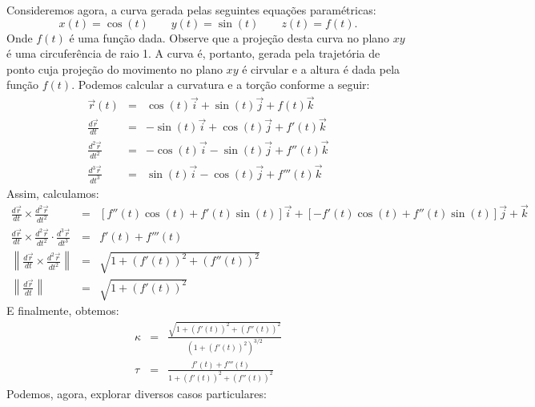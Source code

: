 \begin{ex} \label{exemplo_sincosf} Consideremos agora, a curva gerada pelas seguintes equações paramétricas:
$$x(t)=\cos(t)\qquad y(t)=\sin(t)\qquad z(t)=f(t).$$
 Onde $f(t)$ é uma função dada. Observe que a projeção desta curva no plano $xy$ é uma circuferência de raio 1. A curva é, portanto, gerada pela trajetória de ponto cuja projeção do movimento no plano $xy$ é cirvular e a altura é dada pela função $f(t)$. Podemos calcular a curvatura e a torção conforme a seguir:
 \begin{eqnarray*}
  \vec{r}(t)&=&\cos(t)\vec{i}+\sin(t)\vec{j}+f(t)\vec{k}\\
  \frac{d\vec{r}}{dt}&=&-\sin(t)\vec{i}+\cos(t)\vec{j}+f'(t)\vec{k}\\
  \frac{d^2\vec{r}}{dt^2}&=&-\cos(t)\vec{i}-\sin(t)\vec{j}+f''(t)\vec{k}\\
  \frac{d^3\vec{r}}{dt^3}&=&\sin(t)\vec{i}-\cos(t)\vec{j}+f'''(t)\vec{k}
 \end{eqnarray*}
Assim, calculamos:
 \begin{eqnarray*}
  \frac{d\vec{r}}{dt} \times \frac{d^2 \vec{r}}{dt^2} &=&\left[f''(t)\cos(t)+f'(t)\sin(t)\right]\vec{i}+\left[-f'(t)\cos(t)+f''(t)\sin(t)\right]\vec{j}+\vec{k}\\
\frac{d \vec{r}}{dt} \times \frac{d^2\vec{r}}{dt^2} \cdot \frac{d^3\vec{r}}{dt^3} &=&f'(t)+f'''(t)\\
 \left\|\frac{d\vec{r}}{dt} \times\frac{d^2\vec{r}}{dt^2}\right\|&=&\sqrt{1+\left(f'(t)\right)^2+\left(f''(t)\right)^2}\\
 \left\|\frac{d\vec{r}}{dt}\right\|&=&\sqrt{1+\left(f'(t)\right)^2}
 \end{eqnarray*}
E finalmente, obtemos:
 \begin{eqnarray*}
\kappa&=&\frac{\sqrt{1+\left(f'(t)\right)^2+\left(f''(t)\right)^2}}{\left({1+\left(f'(t)\right)^2}\right)^{3/2}}\\
\tau&=&\frac{f'(t)+f'''(t)}{1+\left(f'(t)\right)^2+\left(f''(t)\right)^2}
 \end{eqnarray*}
Podemos, agora, explorar diversos casos particulares:
\end{ex}

